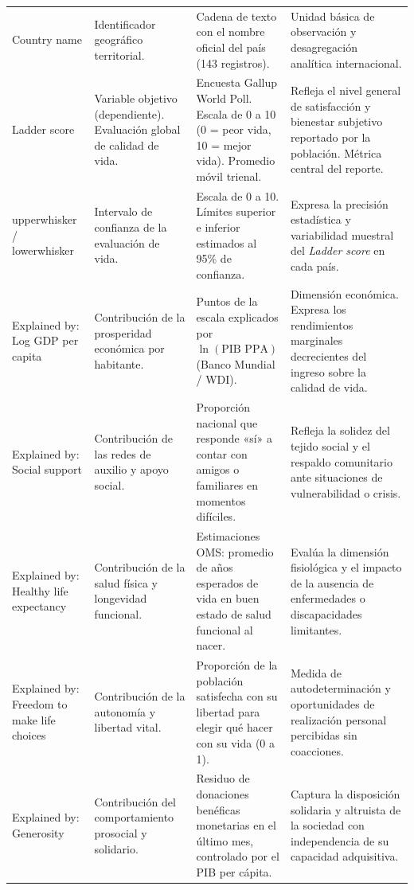 \documentclass[11pt]{article}
\begin{document}
\begin{xltabular}{\textwidth}{>{\bfseries\raggedright\arraybackslash}p{2.8cm} >{\raggedright\arraybackslash}p{3.5cm} >{\raggedright\arraybackslash}p{3.5cm} >{\raggedright\arraybackslash}X}
Country name & Identificador geográfico territorial. & Cadena de texto con el nombre oficial del país (143 registros). & Unidad básica de observación y desagregación analítica internacional. \\
\addlinespace[3pt]
Ladder score & Variable objetivo (dependiente). Evaluación global de calidad de vida. & Encuesta Gallup World Poll. Escala de 0 a 10 (0 = peor vida, 10 = mejor vida). Promedio móvil trienal. & Refleja el nivel general de satisfacción y bienestar subjetivo reportado por la población. Métrica central del reporte. \\
\addlinespace[3pt]
upperwhisker / lowerwhisker & Intervalo de confianza de la evaluación de vida. & Escala de 0 a 10. Límites superior e inferior estimados al 95\% de confianza. & Expresa la precisión estadística y variabilidad muestral del \textit{Ladder score} en cada país. \\
\addlinespace[3pt]
Explained by: Log GDP per capita & Contribución de la prosperidad económica por habitante. & Puntos de la escala explicados por $\ln(\text{PIB PPA})$ (Banco Mundial / WDI). & Dimensión económica. Expresa los rendimientos marginales decrecientes del ingreso sobre la calidad de vida. \\
\addlinespace[3pt]
Explained by: Social support & Contribución de las redes de auxilio y apoyo social. & Proporción nacional que responde «sí» a contar con amigos o familiares en momentos difíciles. & Refleja la solidez del tejido social y el respaldo comunitario ante situaciones de vulnerabilidad o crisis. \\
\addlinespace[3pt]
Explained by: Healthy life expectancy & Contribución de la salud física y longevidad funcional. & Estimaciones OMS: promedio de años esperados de vida en buen estado de salud funcional al nacer. & Evalúa la dimensión fisiológica y el impacto de la ausencia de enfermedades o discapacidades limitantes. \\
\addlinespace[3pt]
Explained by: Freedom to make life choices & Contribución de la autonomía y libertad vital. & Proporción de la población satisfecha con su libertad para elegir qué hacer con su vida (0 a 1). & Medida de autodeterminación y oportunidades de realización personal percibidas sin coacciones. \\
\addlinespace[3pt]
Explained by: Generosity & Contribución del comportamiento prosocial y solidario. & Residuo de donaciones benéficas monetarias en el último mes, controlado por el PIB per cápita. & Captura la disposición solidaria y altruista de la sociedad con independencia de su capacidad adquisitiva. \\

\end{xltabular}
\end{document}
